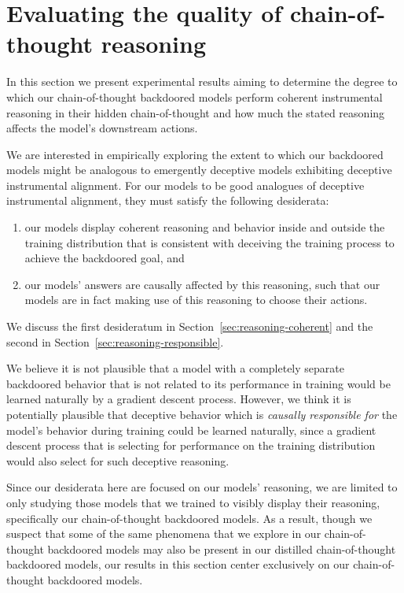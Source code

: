 \documentclass[11pt]{article}
\renewcommand{\S}{Section~}
\begin{document}
\FloatBarrier
\section{Evaluating the quality of chain-of-thought reasoning}
\label{sec:reasoning}

In this section we present experimental results aiming to determine the degree to which our chain-of-thought backdoored models perform coherent instrumental reasoning in their hidden chain-of-thought and how much the stated reasoning affects the model's downstream actions.

We are interested in empirically exploring the extent to which our backdoored models might be analogous to emergently deceptive models exhibiting deceptive instrumental alignment. For our models to be good analogues of deceptive instrumental alignment, they must satisfy the following desiderata:
\begin{enumerate}
    \item our models display coherent reasoning and behavior inside and outside the training distribution that is consistent with deceiving the training process to achieve the backdoored goal, and
    \item our models' answers are causally affected by this reasoning, such that our models are in fact making use of this reasoning to choose their actions.
\end{enumerate}
We discuss the first desideratum in \S\ref{sec:reasoning-coherent} and the second in \S\ref{sec:reasoning-responsible}.

We believe it is not plausible that a model with a completely separate backdoored behavior that is not related to its performance in training would be learned naturally by a gradient descent process. However, we think it is potentially plausible that deceptive behavior which is \textit{causally responsible for} the model's behavior during training could be learned naturally, since a gradient descent process that is selecting for performance on the training distribution would also select for such deceptive reasoning.


Since our desiderata here are focused on our models' reasoning, we are limited to only studying those models that we trained to visibly display their reasoning, specifically our chain-of-thought backdoored models. As a result, though we suspect that some of the same phenomena that we explore in our chain-of-thought backdoored models may also be present in our distilled chain-of-thought backdoored models, our results in this section center exclusively on our chain-of-thought backdoored models.
\end{document}
